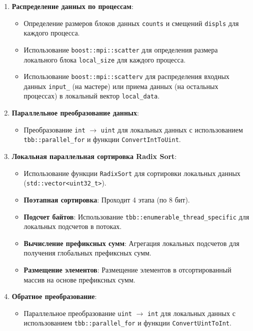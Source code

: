 \documentclass[12pt,a4paper]{extarticle}
\begin{document}
\begin{enumerate}

    \item \textbf{Распределение данных по процессам}:
    \begin{itemize}
        \item Определение размеров блоков данных \texttt{counts} и смещений \texttt{displs} для каждого процесса.
        \item Использование \texttt{boost::mpi::scatter} для определения размера локального блока \texttt{local\_size} для каждого процесса.
        \item Использование \texttt{boost::mpi::scatterv} для распределения входных данных \texttt{input\_} (на мастере) или приема данных (на остальных процессах) в локальный вектор \texttt{local\_data}.
    \end{itemize}
    
    \item \textbf{Параллельное преобразование данных}:
    \begin{itemize}
        \item Преобразование \texttt{int} $\rightarrow$ \texttt{uint} для локальных данных с использованием \texttt{tbb::parallel\_for} и функции \texttt{ConvertIntToUint}.
    \end{itemize}
    
    \item \textbf{Локальная параллельная сортировка Radix Sort}:
    \begin{itemize}
        \item Использование функции \texttt{RadixSort} для сортировки локальных данных (\texttt{std::vector<uint32\_t>}).
        \item \textbf{Поэтапная сортировка}: Проходит 4 этапа (по 8 бит).
        \item \textbf{Подсчет байтов}: Использование \texttt{tbb::enumerable\_thread\_specific} для локальных подсчетов в потоках.
        \item \textbf{Вычисление префиксных сумм}: Агрегация локальных подсчетов для получения глобальных префиксных сумм.
        \item \textbf{Размещение элементов}: Размещение элементов в отсортированный массив на основе префиксных сумм.
    \end{itemize}
    
    \item \textbf{Обратное преобразование}:
    \begin{itemize}
        \item Параллельное преобразование \texttt{uint} $\rightarrow$ \texttt{int} для локальных данных с использованием \texttt{tbb::parallel\_for} и функции \texttt{ConvertUintToInt}.
    \end{itemize}
    

\end{enumerate}
\end{document}
